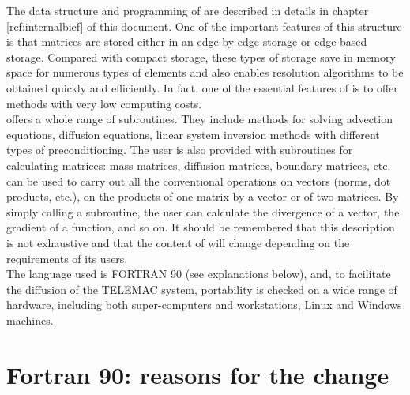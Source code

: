 The data structure and programming of \bief are described in details in
chapter \ref{ref:internalbief} of
this document. One of the important features of this structure is that matrices
are stored either
in an edge-by-edge storage or edge-based storage. Compared
with compact storage, these types of storage save in memory space for numerous
types of elements and also enables resolution algorithms to be obtained quickly
and efficiently. In fact, one of the essential features of \bief is to offer
methods with very low computing costs.
\\
\bief offers a whole range of subroutines. They include methods for solving
advection equations, diffusion equations, linear system inversion methods with
different types of preconditioning. The user is also provided with subroutines
for calculating matrices: mass matrices, diffusion matrices, boundary matrices,
etc. \bief can be used to carry out all the conventional operations on vectors
(norms, dot products, etc.), on the products of one matrix by a vector or of
two matrices. By simply calling a subroutine, the user can calculate the
divergence of a vector, the gradient of a function, and so on. It should be
remembered that this description is not exhaustive and that the content of \bief
will change depending on the requirements of its users.
\\
The language used is FORTRAN 90 (see explanations below), and, to facilitate
the diffusion of the TELEMAC system, portability is checked on a wide range of
hardware, including both super-computers and workstations, Linux and Windows
machines.

\section{Fortran 90: reasons for the change}

